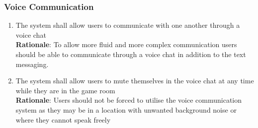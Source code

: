 \documentclass[12pt]{article}
\begin{document}
\subsubsection{Voice Communication}
    \begin{enumerate}[label=VM\arabic*., series=VoiceMessage]
        \item The system shall allow users to communicate with one another through a voice chat\\
        \textbf{Rationale}: To allow more fluid and more complex communication users should be able to communicate through a voice chat in addition to the text messaging.
        \item The system shall allow users to mute themselves in the voice chat at any time while they are in the game room\\
        \textbf{Rationale}: Users should not be forced to utilise the voice communication system as they may be in a location with unwanted background noise or where they cannot speak freely
    \end{enumerate}
\end{document}
